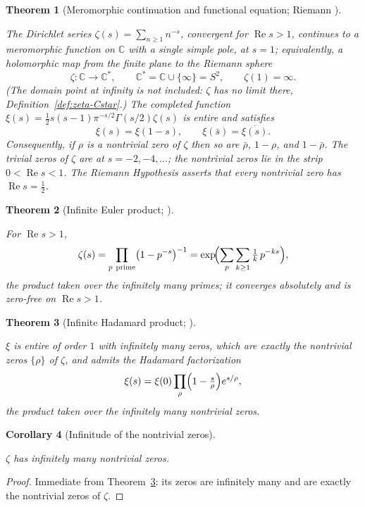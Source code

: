 \documentclass[11pt]{article}
\newcommand{\CC}{\mathbb{C}}
\newcommand{\Cstar}{\CC^{*}}
\DeclareMathOperator{\re}{Re}
\providecommand{\lean}[1]{}
\providecommand{\uses}[1]{}
\theoremstyle{plain}
\newtheorem{theorem}{Theorem}[section]
\newtheorem{corollary}[theorem]{Corollary}
\theoremstyle{definition}
\theoremstyle{remark}
\begin{document}
\begin{theorem}[Meromorphic continuation and functional equation; Riemann \cite{Riemann1859}]\label{thm:riemann}
\lean{riemannZeta_meromorphicOn, riemannZeta_orderAt_one,
riemannZeta_conj, riemannZeta_one_sub_zero, nontrivialZero_re_mem_Ioo}
The Dirichlet series $\zeta(s)=\sum_{n\ge1}n^{-s}$, convergent for $\re s>1$, continues to a
meromorphic function on $\CC$ with a single simple pole, at $s=1$; equivalently, a holomorphic map
from the finite plane to the Riemann sphere
\[
  \zeta:\CC\longrightarrow\Cstar,\qquad \Cstar=\CC\cup\{\infty\}=S^2,\qquad \zeta(1)=\infty .
\]
(The domain point at infinity is not included: $\zeta$ has no limit there, Definition~\ref{def:zeta-Cstar}.)
The completed function $\xi(s)=\tfrac12 s(s-1)\pi^{-s/2}\Gamma(s/2)\zeta(s)$ is entire and satisfies
\[
  \xi(s)=\xi(1-s),\qquad \xi(\bar s)=\overline{\xi(s)} .
\]
Consequently, if $\rho$ is a nontrivial zero of $\zeta$ then so are $\bar\rho$, $1-\rho$, and
$1-\bar\rho$. The trivial zeros of $\zeta$ are at $s=-2,-4,\dots$; the nontrivial zeros lie in the
strip $0<\re s<1$. The Riemann Hypothesis asserts that every nontrivial zero has $\re s=\tfrac12$.
\end{theorem}

\begin{theorem}[Infinite Euler product; {\cite[Ch.~1]{Titchmarsh86}}]\label{thm:euler}
\lean{zetaEulerLog, zetaC2_summable, zetaC2_zero_free, zetaC2_euler}
For $\re s>1$,
\[
  \zeta(s)=\prod_{p\ \mathrm{prime}}\bigl(1-p^{-s}\bigr)^{-1}
         =\exp\!\Bigl(\sum_{p}\sum_{k\ge1}\tfrac1k\,p^{-ks}\Bigr),
\]
the product taken over the infinitely many primes; it converges absolutely and is zero-free on
$\re s>1$.
\end{theorem}

\begin{theorem}[Infinite Hadamard product; {\cite[Ch.~2]{Titchmarsh86}}]\label{thm:hadamard}
\lean{xi_entire, xi_zeros_eq_nontrivialZeros, zeta_hadamard,
riemannZeta_nontrivialZeros_infinite}
$\xi$ is entire of order $1$ with infinitely many zeros, which are exactly the nontrivial zeros
$\{\rho\}$ of $\zeta$, and admits the Hadamard factorization
\[
  \xi(s)=\xi(0)\prod_{\rho}\Bigl(1-\tfrac{s}{\rho}\Bigr)e^{s/\rho},
\]
the product taken over the infinitely many nontrivial zeros.
\end{theorem}

\begin{corollary}[Infinitude of the nontrivial zeros]\label{cor:hadamard-infinitude}
\lean{riemannZeta_nontrivialZeros_infinite}
\uses{thm:hadamard}
$\zeta$ has infinitely many nontrivial zeros.
\end{corollary}
\begin{proof}
Immediate from Theorem~\ref{thm:hadamard}: its zeros are infinitely many and are exactly
the nontrivial zeros of $\zeta$.
\end{proof}
\end{document}
